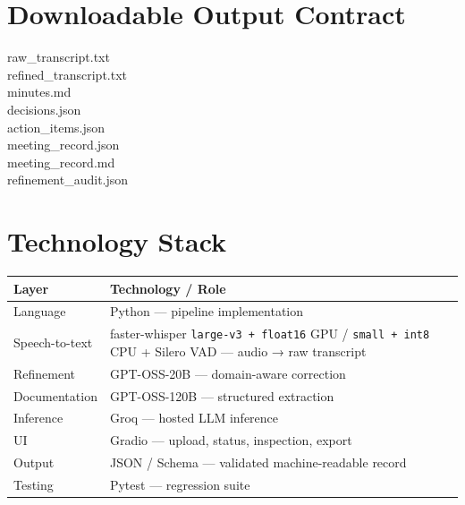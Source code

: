 \documentclass[9pt,a4paper]{extarticle}
\begin{document}
\vspace{1.5pt}
\begin{minipage}[t]{0.46\textwidth}
\section*{Downloadable Output Contract}
\begin{card}\ttfamily\scriptsize
raw\_transcript.txt\\
refined\_transcript.txt\\
minutes.md\\
decisions.json\\
action\_items.json\\
meeting\_record.json\\
meeting\_record.md\\
refinement\_audit.json
\end{card}
\end{minipage}\hfill
\begin{minipage}[t]{0.51\textwidth}
\section*{Technology Stack}
\scriptsize
\begin{tabularx}{\linewidth}{@{}l X@{}}
\toprule
\textbf{Layer} & \textbf{Technology / Role}\\
\midrule
Language & Python — pipeline implementation\\
Speech-to-text & faster-whisper \texttt{large-v3 + float16} GPU / \texttt{small + int8} CPU + Silero VAD — audio → raw transcript\\
Refinement & GPT-OSS-20B — domain-aware correction\\
Documentation & GPT-OSS-120B — structured extraction\\
Inference & Groq — hosted LLM inference\\
UI & Gradio — upload, status, inspection, export\\
Output & JSON / Schema — validated machine-readable record\\
Testing & Pytest — regression suite\\
\bottomrule
\end{tabularx}
\end{minipage}
\vspace{1.5pt}
\end{document}
